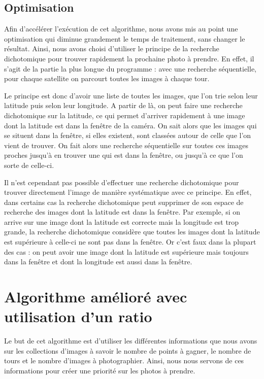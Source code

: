 \documentclass[11pt]{article}
\begin{document}
		\subsection{Optimisation}
		
			Afin d'accélérer l'exécution de cet algorithme, nous avons mis au point une optimisation qui diminue grandement le temps de traitement, sans changer le résultat. Ainsi, nous avons choisi d'utiliser le principe de la recherche dichotomique pour trouver rapidement la prochaine photo à prendre. En effet, il s'agit de la partie la plus longue du programme : avec une recherche séquentielle, pour chaque satellite on parcourt toutes les images à chaque tour.
			
			Le principe est donc d'avoir une liste de toutes les images, que l'on trie selon leur latitude puis selon leur longitude. A partir de là, on peut faire une recherche dichotomique sur la latitude, ce qui permet d'arriver rapidement à une image dont la latitude est dans la fenêtre de la caméra. On sait alors que les images qui se situent dans la fenêtre, si elles existent, sont classées autour de celle que l'on vient de trouver. On fait alors une recherche séquentielle sur toutes ces images proches jusqu'à en trouver une qui est dans la fenêtre, ou jusqu'à ce que l'on sorte de celle-ci.
			
			Il n'est cependant pas possible d'effectuer une recherche dichotomique pour trouver directement l'image de manière systématique avec ce principe. En effet, dans certains cas la recherche dichotomique peut supprimer de son espace de recherche des images dont la latitude est dans la fenêtre. Par exemple, si on arrive sur une image dont la latitude est correcte mais la longitude est trop grande, la recherche dichotomique considère que toutes les images dont la latitude est supérieure à celle-ci ne sont pas dans la fenêtre. Or c'est faux dans la plupart des cas : on peut avoir une image dont la latitude est supérieure mais toujours dans la fenêtre et dont la longitude est aussi dans la fenêtre.
			
	\section{Algorithme amélioré avec utilisation d'un ratio}
	
		Le but de cet algorithme est d'utiliser les différentes informations que nous avons sur les collections d'images à savoir le nombre de points à gagner, le nombre de tours et le nombre d'images à photographier. Ainsi, nous nous servons de ces informations pour créer une priorité sur les photos à prendre.
	
\end{document}
